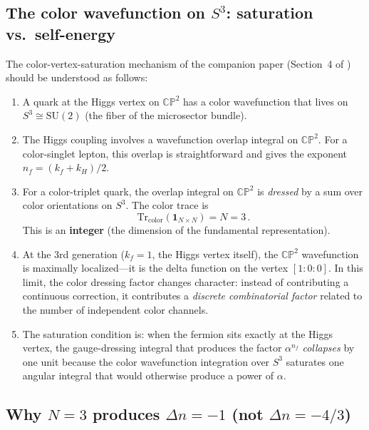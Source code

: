 \documentclass[11pt,a4paper]{article}
\newcommand{\CP}{\mathbb{CP}}
\newcommand{\Tr}{\mathrm{Tr}}
\theoremstyle{definition}
\theoremstyle{remark}
\begin{document}
\subsection{The color wavefunction on $S^3$: saturation vs.\ self-energy}
\label{sec:saturation}

The color-vertex-saturation mechanism of the companion paper
(Section~4 of \cite{BQuarkDerivation}) should be understood as
follows:

\begin{enumerate}
\item A quark at the Higgs vertex on $\CP^2$ has a color wavefunction
that lives on $S^3 \cong \mathrm{SU}(2)$ (the fiber of the microsector
bundle).

\item The Higgs coupling involves a wavefunction overlap integral on
$\CP^2$.  For a color-singlet lepton, this overlap is straightforward
and gives the exponent $n_f = (k_f + k_H)/2$.

\item For a color-triplet quark, the overlap integral on $\CP^2$ is
\emph{dressed} by a sum over color orientations on $S^3$.  The color
trace is
\begin{equation}\label{eq:color-trace}
\Tr_{\mathrm{color}}(\mathbf{1}_{N\times N}) = N = 3\,.
\end{equation}
This is an \textbf{integer} (the dimension of the fundamental
representation).

\item At the 3rd generation ($k_f = 1$, the Higgs vertex itself),
the $\CP^2$ wavefunction is maximally localized---it is the delta
function on the vertex $[1:0:0]$.  In this limit, the color dressing
factor changes character: instead of contributing a continuous
correction, it contributes a \emph{discrete combinatorial factor}
related to the number of independent color channels.

\item The saturation condition is: when the fermion sits exactly at
the Higgs vertex, the gauge-dressing integral that produces the factor
$\alpha^{n_f}$ \emph{collapses} by one unit because the color
wavefunction integration over $S^3$ saturates one angular integral
that would otherwise produce a power of $\alpha$.
\end{enumerate}

\subsection{Why $N = 3$ produces $\Delta n = -1$ (not $\Delta n = -4/3$)}
\end{document}
